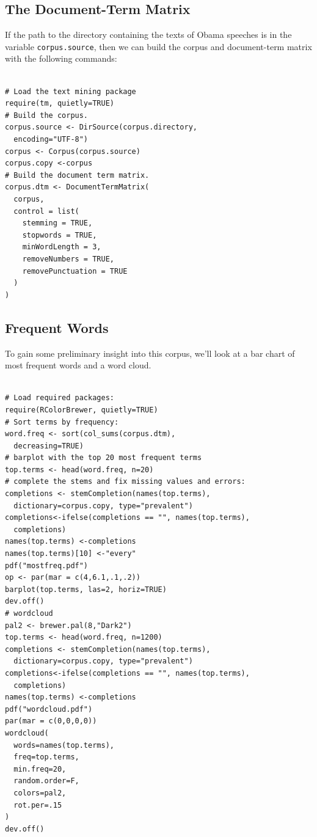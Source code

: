 \documentclass[%
	final,
	notitlepage,
	narroweqnarray,
	inline,
	]{ieee}
\begin{document}
\subsection{The Document-Term Matrix}

\PARstart If the path to the directory containing the texts of Obama speeches is in
the variable {\tt corpus.source}, then we can build the corpus and document-term matrix
with the following commands:

\begin{verbatim}

# Load the text mining package
require(tm, quietly=TRUE)
# Build the corpus.
corpus.source <- DirSource(corpus.directory, 
  encoding="UTF-8")
corpus <- Corpus(corpus.source)
corpus.copy <-corpus
# Build the document term matrix.
corpus.dtm <- DocumentTermMatrix(
  corpus, 
  control = list(
    stemming = TRUE, 
    stopwords = TRUE, 
    minWordLength = 3,
    removeNumbers = TRUE, 
    removePunctuation = TRUE
  )
)
\end{verbatim}

\subsection{Frequent Words}

\PARstart To gain some preliminary insight into this corpus, we'll 
look at a bar chart of most frequent words and a word cloud.

\begin{verbatim}

# Load required packages:
require(RColorBrewer, quietly=TRUE)
# Sort terms by frequency:
word.freq <- sort(col_sums(corpus.dtm), 
  decreasing=TRUE)
# barplot with the top 20 most frequent terms
top.terms <- head(word.freq, n=20)
# complete the stems and fix missing values and errors:
completions <- stemCompletion(names(top.terms), 
  dictionary=corpus.copy, type="prevalent")
completions<-ifelse(completions == "", names(top.terms), 
  completions)
names(top.terms) <-completions
names(top.terms)[10] <-"every"
pdf("mostfreq.pdf")
op <- par(mar = c(4,6.1,.1,.2))
barplot(top.terms, las=2, horiz=TRUE)
dev.off()
# wordcloud
pal2 <- brewer.pal(8,"Dark2")
top.terms <- head(word.freq, n=1200)
completions <- stemCompletion(names(top.terms), 
  dictionary=corpus.copy, type="prevalent")
completions<-ifelse(completions == "", names(top.terms), 
  completions)
names(top.terms) <-completions
pdf("wordcloud.pdf")
par(mar = c(0,0,0,0))
wordcloud(
  words=names(top.terms), 
  freq=top.terms, 
  min.freq=20, 
  random.order=F, 
  colors=pal2, 
  rot.per=.15
)
dev.off()
\end{verbatim}
\end{document}
